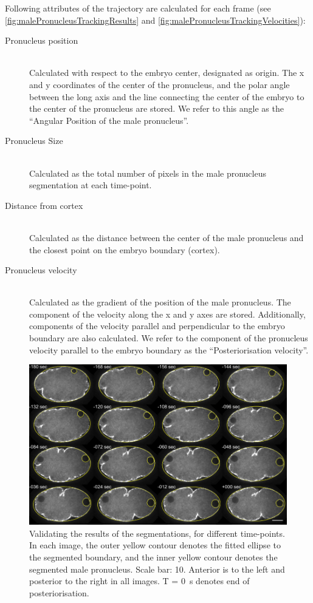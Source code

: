 Following attributes of the trajectory are calculated for each frame (see \autoref{fig:malePronucleusTrackingResults} and \autoref{fig:malePronucleusTrackingVelocities}):
\begin{description}
    \item[Pronucleus position]\hfill\\
    Calculated with respect to the embryo center, designated as origin. The x and y coordinates of the center of the pronucleus, and the polar angle between the long axis and the line connecting the center of the embryo to the center of the pronucleus are stored. We refer to this angle as the \enquote{Angular Position of the male pronucleus}.
    \item[Pronucleus Size]\hfill\\
    Calculated as the total number of pixels in the male pronucleus segmentation at each time-point.
    \item[Distance from cortex]\hfill\\
    Calculated as the distance between the center of the male pronucleus and the closest point on the embryo boundary (cortex).
    \item[Pronucleus velocity]\hfill\\
    Calculated as the gradient of the position of the male pronucleus. The component of the velocity along the x and y axes are stored. Additionally, components of the velocity parallel and perpendicular to the embryo boundary are also calculated. We refer to the component of the pronucleus velocity parallel to the embryo boundary as the \enquote{Posteriorisation velocity}.
\end{description}

\begin{figure}[h]
\centering
\includegraphics[width=\textwidth]{ExpMethods/FigTrackNucleus/validate.pdf}
\caption[Image analysis: Validation]{Validating the results of the segmentations, for different time-points. In each image, the outer yellow contour denotes the fitted ellipse to the segmented boundary, and the inner yellow contour denotes the segmented male pronucleus. Scale bar: \SI{10}{\unitLength}. Anterior is to the left and posterior to the right in all images. T = \SI{0}{\second} denotes end of posteriorisation.}
\label{fig:validateSegmentations}
\end{figure}

